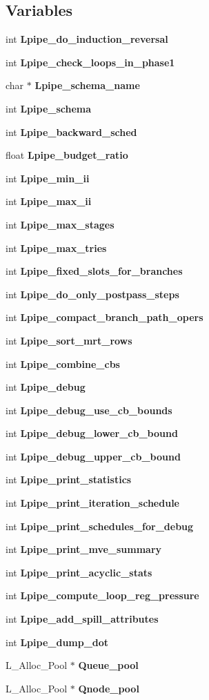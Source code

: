 \subsection*{Variables}
\begin{CompactItemize}
\item 
int \bf{Lpipe\_\-do\_\-induction\_\-reversal}
\item 
int \bf{Lpipe\_\-check\_\-loops\_\-in\_\-phase1}
\item 
char $\ast$ \bf{Lpipe\_\-schema\_\-name}
\item 
int \bf{Lpipe\_\-schema}
\item 
int \bf{Lpipe\_\-backward\_\-sched}
\item 
float \bf{Lpipe\_\-budget\_\-ratio}
\item 
int \bf{Lpipe\_\-min\_\-ii}
\item 
int \bf{Lpipe\_\-max\_\-ii}
\item 
int \bf{Lpipe\_\-max\_\-stages}
\item 
int \bf{Lpipe\_\-max\_\-tries}
\item 
int \bf{Lpipe\_\-fixed\_\-slots\_\-for\_\-branches}
\item 
int \bf{Lpipe\_\-do\_\-only\_\-postpass\_\-steps}
\item 
int \bf{Lpipe\_\-compact\_\-branch\_\-path\_\-opers}
\item 
int \bf{Lpipe\_\-sort\_\-mrt\_\-rows}
\item 
int \bf{Lpipe\_\-combine\_\-cbs}
\item 
int \bf{Lpipe\_\-debug}
\item 
int \bf{Lpipe\_\-debug\_\-use\_\-cb\_\-bounds}
\item 
int \bf{Lpipe\_\-debug\_\-lower\_\-cb\_\-bound}
\item 
int \bf{Lpipe\_\-debug\_\-upper\_\-cb\_\-bound}
\item 
int \bf{Lpipe\_\-print\_\-statistics}
\item 
int \bf{Lpipe\_\-print\_\-iteration\_\-schedule}
\item 
int \bf{Lpipe\_\-print\_\-schedules\_\-for\_\-debug}
\item 
int \bf{Lpipe\_\-print\_\-mve\_\-summary}
\item 
int \bf{Lpipe\_\-print\_\-acyclic\_\-stats}
\item 
int \bf{Lpipe\_\-compute\_\-loop\_\-reg\_\-pressure}
\item 
int \bf{Lpipe\_\-add\_\-spill\_\-attributes}
\item 
int \bf{Lpipe\_\-dump\_\-dot}
\item 
L\_\-Alloc\_\-Pool $\ast$ \bf{Queue\_\-pool}
\item 
L\_\-Alloc\_\-Pool $\ast$ \bf{Qnode\_\-pool}
\end{CompactItemize}


